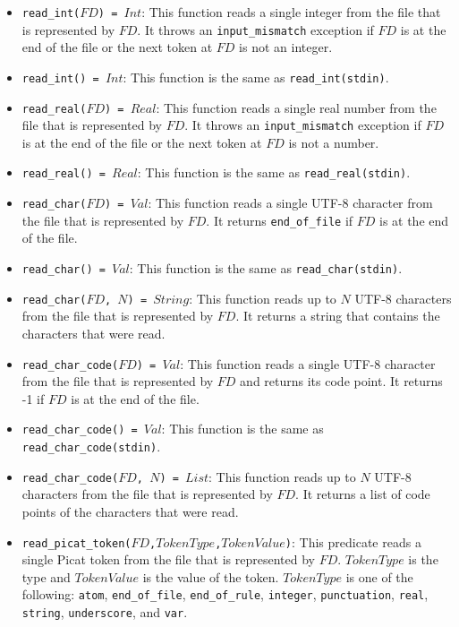 \begin{itemize}
\item \texttt{read\_int($FD$) = $Int$}: This function reads a single integer from the file that is represented by $FD$. It throws an {\tt input\_mismatch} exception if $FD$ is at the end of the file or the next token at $FD$ is not an integer.

\item \texttt{read\_int() = $Int$}: This function is the same as \texttt{read\_int(stdin)}.
\item \texttt{read\_real($FD$) = $Real$}: This function reads a single real number from the file that is represented by $FD$. It throws an {\tt input\_mismatch} exception if $FD$ is at the end of the file or the next token at $FD$ is not a number.
\item \texttt{read\_real() = $Real$}: This function is the same as \texttt{read\_real(stdin)}.
\item \texttt{read\_char($FD$) = $Val$}: This function reads a single UTF-8 character from the file that is represented by $FD$. It returns {\tt end\_of\_file} if $FD$ is at the end of the file.
\item \texttt{read\_char() = $Val$}: This function is the same as \texttt{read\_char(stdin)}.
\item \texttt{read\_char($FD$, $N$) = $String$}: This function reads up to $N$ UTF-8 characters from the file that is represented by $FD$.  It returns a string that contains the characters that were read.
\item \texttt{read\_char\_code($FD$) = $Val$}: This function reads a single UTF-8 character from the file that is represented by $FD$ and returns its code point. It returns -1 if $FD$ is at the end of the file.
\item \texttt{read\_char\_code() = $Val$}: This function is the same as \texttt{read\_char\_code(stdin)}.
\item \texttt{read\_char\_code($FD$, $N$) = $List$}: This function reads up to $N$ UTF-8 characters from the file that is represented by $FD$.  It returns a list of code points of the characters that were read.
\item \texttt{read\_picat\_token($FD$,$TokenType$,$TokenValue$)}: This predicate reads a single Picat token from the file that is represented by $FD$. $TokenType$ is the type and $TokenValue$ is the value of the token. $TokenType$ is one of the following: \texttt{atom}, \texttt{end\_of\_file}, \texttt{end\_of\_rule}, \texttt{integer}, \texttt{punctuation}, \texttt{real},  \texttt{string},  \texttt{underscore}, and \texttt{var}.

\end{itemize}
